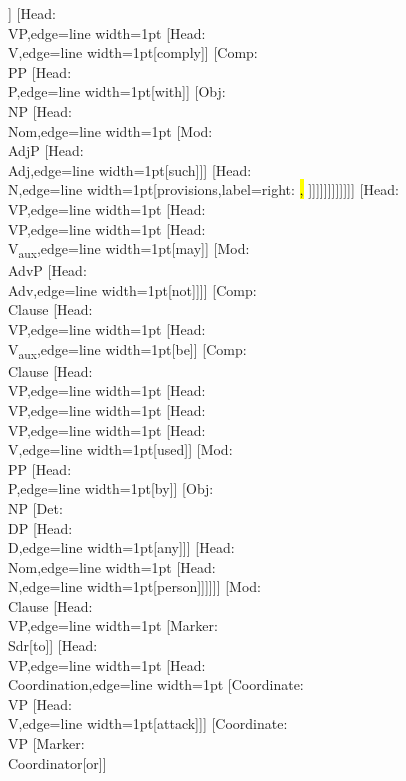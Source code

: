 \documentclass[tikz,border=12pt]{standalone}
\newcommand{\p}[1]{%
    \sethlcolor{white}\color{gray}\hl{#1}%
}
\newcommand{\Node}[2]{\small\textsf{#1:}\\{#2}}
\begin{document}
\begin{forest}
                            [\Node{Marker}{Sdr}[to]]
                            [\Node{Head}{VP},edge={line width=1pt}
                                [\Node{Head}{V},edge={line width=1pt}[comply]]
                                [\Node{Comp}{PP}
                                    [\Node{Head}{P},edge={line width=1pt}[with]]
                                    [\Node{Obj}{NP}
                                        [\Node{Head}{Nom},edge={line width=1pt}
                                            [\Node{Mod}{AdjP}
                                                [\Node{Head}{Adj},edge={line width=1pt}[such]]]
                                            [\Node{Head}{N},edge={line width=1pt}[provisions,label={right:\p{{,}}}]]]]]]]]]]]]
    [\Node{Head}{VP},edge={line width=1pt}
        [\Node{Head}{VP},edge={line width=1pt}
            [\Node{Head}{V\textsubscript{aux}},edge={line width=1pt}[may]]
            [\Node{Mod}{AdvP}
                [\Node{Head}{Adv},edge={line width=1pt}[not]]]]
        [\Node{Comp}{Clause}
            [\Node{Head}{VP},edge={line width=1pt}
                [\Node{Head}{V\textsubscript{aux}},edge={line width=1pt}[be]]
                [\Node{Comp}{Clause}
                    [\Node{Head}{VP},edge={line width=1pt}
                        [\Node{Head}{VP},edge={line width=1pt}
                            [\Node{Head}{VP},edge={line width=1pt}
                                [\Node{Head}{V},edge={line width=1pt}[used]]
                                [\Node{Mod}{PP}
                                    [\Node{Head}{P},edge={line width=1pt}[by]]
                                    [\Node{Obj}{NP}
                                        [\Node{Det}{DP}
                                            [\Node{Head}{D},edge={line width=1pt}[any]]]
                                        [\Node{Head}{Nom},edge={line width=1pt}
                                            [\Node{Head}{N},edge={line width=1pt}[person]]]]]]
                            [\Node{Mod}{Clause}
                                [\Node{Head}{VP},edge={line width=1pt}
                                    [\Node{Marker}{Sdr}[to]]
                                    [\Node{Head}{VP},edge={line width=1pt}
                                        [\Node{Head}{Coordination},edge={line width=1pt}
                                            [\Node{Coordinate}{VP}
                                                [\Node{Head}{V},edge={line width=1pt}[attack]]]
                                            [\Node{Coordinate}{VP}
                                                [\Node{Marker}{Coordinator}[or]]

\end{forest}
\end{document}
